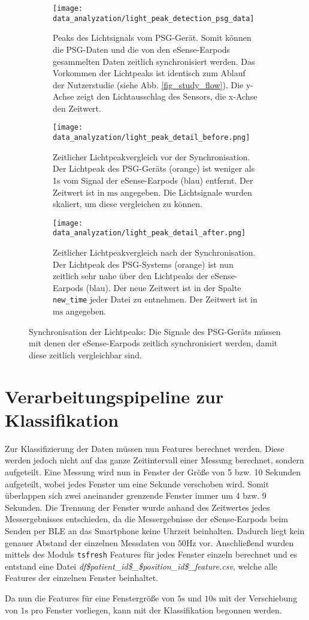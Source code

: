 \begin{figure}[ht]
  \centering
  \begin{subfigure}{0.66\textwidth}
    \texttt{[image: data\_analyzation/light\_peak\_detection\_psg\_data]}
    \caption{Peaks des Lichtsignals vom PSG-Gerät. Somit können die PSG-Daten und die von den eSense-Earpods gesammelten Daten zeitlich synchronisiert werden. Das Vorkommen der Lichtpeaks ist identisch zum Ablauf der Nutzerstudie (siehe Abb. \ref{fig_study_flow}). Die y-Achse zeigt den Lichtausschlag des Sensors, die x-Achse den Zeitwert.}
    \label{implementation:synchronisation:peaks_psg}
  \end{subfigure}
  \begin{subfigure}{.49\textwidth}
    \texttt{[image: data\_analyzation/light\_peak\_detail\_before.png]}
    \caption{Zeitlicher Lichtpeakvergleich vor der Synchronisation. Der Lichtpeak des PSG-Geräts (orange) ist weniger als 1s vom Signal der eSense-Earpods (blau) entfernt. Der Zeitwert ist in $\si{\ms}$ angegeben. Die Lichtsignale wurden skaliert, um diese vergleichen zu können. }
    \label{implementation:synchronisation:before_light_peak}
  \end{subfigure}
  \begin{subfigure}{.49\textwidth}
    \texttt{[image: data\_analyzation/light\_peak\_detail\_after.png]}
    \caption{Zeitlicher Lichtpeakvergleich nach der Synchronisation. Der Lichtpeak des PSG-Systems (orange) ist nun zeitlich sehr nahe über den Lichtpeaks der eSense-Earpods (blau). Der neue Zeitwert ist in der Spalte \texttt{new\_time} jeder Datei zu entnehmen. Der Zeitwert ist in $\si{\ms}$ angegeben.}
    \label{implementation:synchronisation:after_light_peak}
  \end{subfigure}
  \caption{Synchronisation der Lichtpeaks: Die Signale des PSG-Geräts müssen mit denen der eSense-Earpods zeitlich synchronisiert werden, damit diese zeitlich vergleichbar sind.}
  \label{implementation:synchronisation:peaks}
\end{figure}

\newpage
\section{Verarbeitungspipeline zur Klassifikation}
\label{ch:Implementierung:classification_pipeline}
Zur Klassifizierung der Daten müssen nun Features berechnet werden. 
Diese werden jedoch nicht auf das ganze Zeitintervall einer Messung berechnet, sondern aufgeteilt.
Eine Messung wird nun in Fenster der Größe von 5 bzw. 10 Sekunden aufgeteilt, wobei jedes Fenster um eine Sekunde verschoben wird. 
Somit überlappen sich zwei aneinander grenzende Fenster immer um 4 bzw. 9 Sekunden. 
Die Trennung der Fenster wurde anhand des Zeitwertes jedes Messergebnisses entschieden, da die Messergebnisse der eSense-Earpods beim Senden per BLE an das Smartphone keine Uhrzeit beinhalten.
Dadurch liegt kein genauer Abstand der einzelnen Messdaten von $50\si{\hertz}$ vor. 
Anschließend wurden mittels des Moduls \texttt{tsfresh} Features für jedes Fenster einzeln berechnet und es entstand eine Datei \textit{df\$patient\_id\$\_\$position\_id\$\_feature.csv}, welche alle Features der einzelnen Fenster beinhaltet.

Da nun die Features für eine Fenstergröße von $5\si{\s}$ und $10\si{\s}$ mit der Verschiebung von $1\si{\s}$ pro Fenster vorliegen, kann mit der Klassifikation begonnen werden.